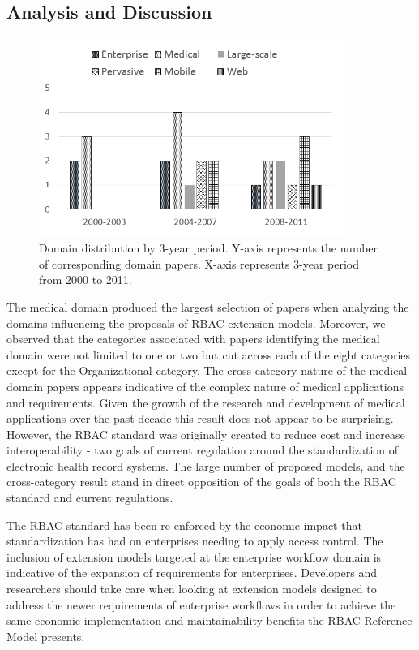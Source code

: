 \subsection{Analysis and Discussion}

\begin{figure}[ht]
    \centering
        \includegraphics[width=4.0in]{sections/dist_domains_byYear.png}
\vspace{-0.2 in}
    \caption{\label{fig:dist_domains}Domain distribution by 3-year period. Y-axis represents the number of corresponding domain papers.
    X-axis represents 3-year period from 2000 to 2011.}
\end{figure}

The medical domain produced the largest selection of papers when analyzing the domains influencing the proposals of RBAC extension models.  
Moreover, we observed that the categories associated with papers identifying the medical domain were not limited to one or two but cut across
each of the eight categories except for the Organizational category. 
The cross-category nature of the medical domain papers appears indicative of the complex nature of medical applications and requirements.
Given the growth of the research and development of medical applications over the past decade this result does not appear to be surprising. However,
the RBAC standard was originally created to reduce cost and increase interoperability - two goals of current regulation around the standardization
of electronic health record systems. The large number of proposed models, and the cross-category result stand in direct opposition of the goals
of both the RBAC standard and current regulations.

The RBAC standard has been re-enforced by the economic impact that standardization has had on enterprises needing to apply access control.  The
inclusion of extension models targeted at the enterprise workflow domain is indicative of the expansion of requirements for enterprises. Developers
and researchers should take care when looking at extension models designed to address the newer requirements of enterprise workflows in order to
achieve the same economic implementation and maintainability benefits the RBAC Reference Model presents.


